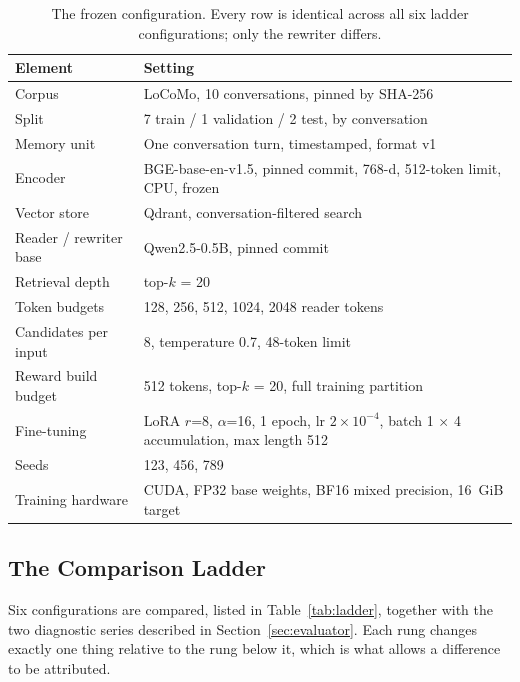 \documentclass[12pt,letterpaper,oneside]{report}
\newenvironment{tab}{\begingroup\singlespacing\small}{\endgroup}
\begin{document}
\begin{table}[htbp]
\caption[The frozen configuration]{The frozen configuration. Every row is identical across all six ladder
configurations; only the rewriter differs.}
\label{tab:frozen}
\centering
\begin{tab}
\begin{tabular}{@{}L{1.55in}L{3.35in}@{}}
\toprule
\textbf{Element} & \textbf{Setting} \\
\midrule
Corpus & LoCoMo, 10 conversations, pinned by SHA-256 \\
Split & 7 train / 1 validation / 2 test, by conversation \\
Memory unit & One conversation turn, timestamped, format v1 \\
Encoder & BGE-base-en-v1.5, pinned commit, 768-d, 512-token
limit, CPU, frozen \\
Vector store & Qdrant, conversation-filtered search \\
Reader / rewriter base & Qwen2.5-0.5B, pinned commit \\
Retrieval depth & top-$k$ = 20 \\
Token budgets & 128, 256, 512, 1024, 2048 reader tokens \\
Candidates per input & 8, temperature 0.7, 48-token limit \\
Reward build budget & 512 tokens, top-$k$ = 20, full training
partition \\
Fine-tuning & LoRA $r$=8, $\alpha$=16, 1 epoch, lr
$2\times10^{-4}$, batch 1 $\times$ 4 accumulation, max length 512 \\
Seeds & 123, 456, 789 \\
Training hardware & CUDA, FP32 base weights, BF16 mixed
precision, 16~GiB target \\
\bottomrule
\end{tabular}
\end{tab}
\end{table}

\subsection{The Comparison Ladder}
\label{sec:ladder}

Six configurations are compared, listed in Table~\ref{tab:ladder}, together
with the two diagnostic series described in Section~\ref{sec:evaluator}. Each
rung changes exactly one thing relative to the rung below it, which is what
allows a difference to be attributed.
\end{document}
